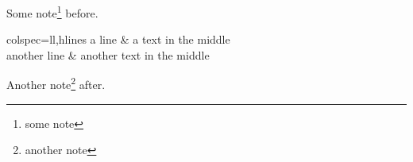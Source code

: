 \documentclass{article}
\begin{document}
Some note\footnote{some note} before.

\bigskip

\begin{longtblr}[evaluate=\footNote]{colspec={ll},hlines}
a line & a text in the middle\\
another line & another text in the middle
\end{longtblr}

\bigskip

Another note\footnote{another note} after.
\end{document}
